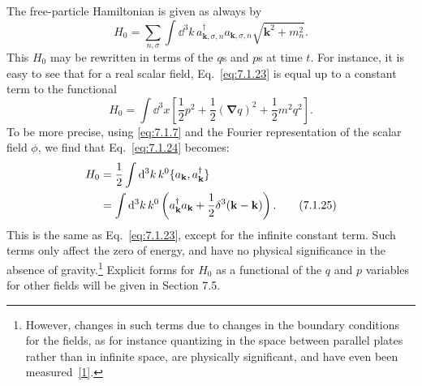 The free-particle Hamiltonian is given as always by
\begin{equation}
H_0=\sum_{n,\sigma}\int \dd^3k\,
a^\dagger_{\mathbf{k},\sigma,n}a_{\mathbf{k},\sigma,n}
\sqrt{\mathbf{k}^2+m_n^2}.
\tag{7.1.23}\label{eq:7.1.23}
\end{equation}
This $H_0$ may be rewritten in terms of the $q$s and $p$s at time $t$. For instance,
it is easy to see that for a real scalar field, Eq.~\eqref{eq:7.1.23} is equal up to a
constant term to the functional
\begin{equation}
H_0=\int \dd^3x\left[\frac12p^2+\frac12(\boldsymbol{\nabla}q)^2
+\frac12m^2q^2\right].
\tag{7.1.24}\label{eq:7.1.24}
\end{equation}
To be more precise, using \eqref{eq:7.1.7} and the Fourier representation of the
scalar field $\phi$, we find that Eq.~\eqref{eq:7.1.24} becomes:
\begin{align}
H_0&=\frac12\int \mathop{}\!\mathrm{d}^3k\,k^0\{a_{\mathbf{k}},a^\dagger_{\mathbf{k}}\}
\notag\\
&=\int \mathop{}\!\mathrm{d}^3k\,k^0\left(a^\dagger_{\mathbf{k}}a_{\mathbf{k}}
+\frac12\delta^3(\mathbf{k}-\mathbf{k})\right).
\tag{7.1.25}\label{eq:7.1.25}
\end{align}
This is the same as Eq.~\eqref{eq:7.1.23}, except for the infinite constant term. Such
terms only affect the zero of energy, and have no physical significance in
the absence of gravity.\footnote{However, changes in such terms due to changes
in the boundary conditions for the fields, as for instance quantizing in the
space between parallel plates rather than in infinite space, are physically
significant, and have even been measured~\hyperref[ref:7.1]{[1]}.} Explicit forms for $H_0$ as a
functional of the $q$ and $p$ variables for other fields will be given in
Section 7.5.

